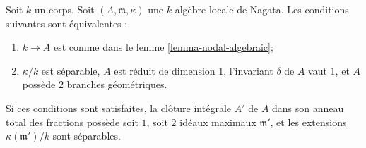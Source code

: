 \begin{lemma}
\label{lemma-2-branches-delta-1}
Soit $k$ un corps. Soit $(A, \mathfrak m, \kappa)$ une $k$-algèbre locale de Nagata. Les conditions suivantes sont équivalentes : \begin{enumerate} \item $k \to A$ est comme dans le lemme \ref{lemma-nodal-algebraic}; \item $\kappa/k$ est séparable, $A$ est réduit de dimension $1$, l'invariant $\delta$ de $A$ vaut $1$, et $A$ possède $2$ branches géométriques. \end{enumerate} Si ces conditions sont satisfaites, la clôture intégrale $A'$ de $A$ dans son anneau total des fractions possède soit $1$, soit $2$ idéaux maximaux $\mathfrak m'$, et les extensions $\kappa(\mathfrak m')/k$ sont séparables.
\end{lemma}

